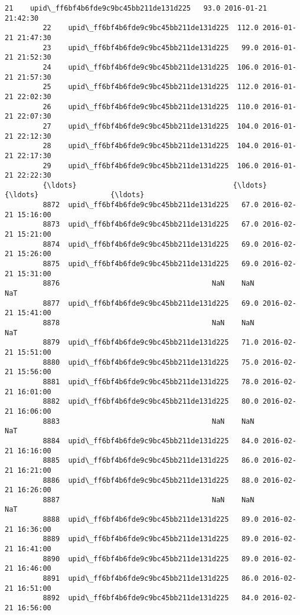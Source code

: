 \documentclass[11pt]{article}
\begin{document}
\begin{Verbatim}[commandchars=\\\{\}]
         21    upid\_ff6bf4b6fde9c9bc45bb211de131d225   93.0 2016-01-21 21:42:30   
         22    upid\_ff6bf4b6fde9c9bc45bb211de131d225  112.0 2016-01-21 21:47:30   
         23    upid\_ff6bf4b6fde9c9bc45bb211de131d225   99.0 2016-01-21 21:52:30   
         24    upid\_ff6bf4b6fde9c9bc45bb211de131d225  106.0 2016-01-21 21:57:30   
         25    upid\_ff6bf4b6fde9c9bc45bb211de131d225  112.0 2016-01-21 22:02:30   
         26    upid\_ff6bf4b6fde9c9bc45bb211de131d225  110.0 2016-01-21 22:07:30   
         27    upid\_ff6bf4b6fde9c9bc45bb211de131d225  104.0 2016-01-21 22:12:30   
         28    upid\_ff6bf4b6fde9c9bc45bb211de131d225  104.0 2016-01-21 22:17:30   
         29    upid\_ff6bf4b6fde9c9bc45bb211de131d225  106.0 2016-01-21 22:22:30   
         {\ldots}                                     {\ldots}    {\ldots}                 {\ldots}   
         8872  upid\_ff6bf4b6fde9c9bc45bb211de131d225   67.0 2016-02-21 15:16:00   
         8873  upid\_ff6bf4b6fde9c9bc45bb211de131d225   67.0 2016-02-21 15:21:00   
         8874  upid\_ff6bf4b6fde9c9bc45bb211de131d225   69.0 2016-02-21 15:26:00   
         8875  upid\_ff6bf4b6fde9c9bc45bb211de131d225   69.0 2016-02-21 15:31:00   
         8876                                    NaN    NaN                 NaT   
         8877  upid\_ff6bf4b6fde9c9bc45bb211de131d225   69.0 2016-02-21 15:41:00   
         8878                                    NaN    NaN                 NaT   
         8879  upid\_ff6bf4b6fde9c9bc45bb211de131d225   71.0 2016-02-21 15:51:00   
         8880  upid\_ff6bf4b6fde9c9bc45bb211de131d225   75.0 2016-02-21 15:56:00   
         8881  upid\_ff6bf4b6fde9c9bc45bb211de131d225   78.0 2016-02-21 16:01:00   
         8882  upid\_ff6bf4b6fde9c9bc45bb211de131d225   80.0 2016-02-21 16:06:00   
         8883                                    NaN    NaN                 NaT   
         8884  upid\_ff6bf4b6fde9c9bc45bb211de131d225   84.0 2016-02-21 16:16:00   
         8885  upid\_ff6bf4b6fde9c9bc45bb211de131d225   86.0 2016-02-21 16:21:00   
         8886  upid\_ff6bf4b6fde9c9bc45bb211de131d225   88.0 2016-02-21 16:26:00   
         8887                                    NaN    NaN                 NaT   
         8888  upid\_ff6bf4b6fde9c9bc45bb211de131d225   89.0 2016-02-21 16:36:00   
         8889  upid\_ff6bf4b6fde9c9bc45bb211de131d225   89.0 2016-02-21 16:41:00   
         8890  upid\_ff6bf4b6fde9c9bc45bb211de131d225   89.0 2016-02-21 16:46:00   
         8891  upid\_ff6bf4b6fde9c9bc45bb211de131d225   86.0 2016-02-21 16:51:00   
         8892  upid\_ff6bf4b6fde9c9bc45bb211de131d225   84.0 2016-02-21 16:56:00   

\end{Verbatim}
\end{document}
